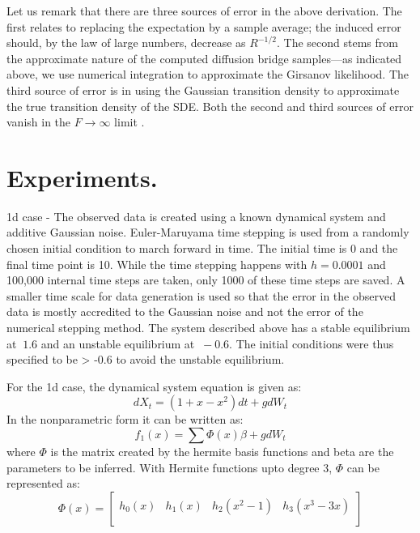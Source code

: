 \documentclass{article}
\begin{document}
Let us remark that there are three sources of error in the above derivation.  The first relates to replacing the expectation by a sample average; the induced error should, by the law of large numbers, decrease as $R^{-1/2}$.  The second stems from the approximate nature of the computed diffusion bridge samples---as indicated above, we use numerical integration to approximate the Girsanov likelihood.  The third source of error is in using the Gaussian transition density to approximate the true transition density of the SDE.  Both the second and third sources of error vanish in the $F \to \infty$ limit \cite{kloeden_numerical_2011}.

\section{Experiments.}
1d case - The observed data is created using a known dynamical system and additive Gaussian noise. Euler-Maruyama time stepping is used from a randomly chosen initial condition to march forward in time. The initial time is 0 and the final time point is 10. While the time stepping happens with $h = 0.0001$ and 100,000 internal time steps are taken, only 1000 of these time steps are saved. A smaller time scale for data generation is used so that the error in the observed data is mostly accredited to the Gaussian noise and not the error of the numerical stepping method. The system described above has a stable equilibrium at $~1.6$ and an unstable equilibrium at $~ -0.6$. The initial conditions were thus specified to be > -0.6 to avoid the unstable equilibrium.

For the 1d case, the dynamical system equation is given as:
\begin{equation}
dX_t = (1 + x - x^2) dt + g dW_t
\end{equation}
In the nonparametric form it can be written as:
\begin{equation}
f_1(x) = \sum \Phi(x) \beta + g dW_t
\end{equation}
where $\Phi$ is the matrix created by the hermite basis functions and beta are the parameters to be inferred. With Hermite functions upto degree 3, $\Phi$ can be represented as:
\begin{equation}
\Phi(x) =
\begin{bmatrix}
    h_0(x) & h_1(x) & h_2(x^2 - 1) & h_3(x^3 - 3x) \\
\end{bmatrix}
\end{equation}
\end{document}

